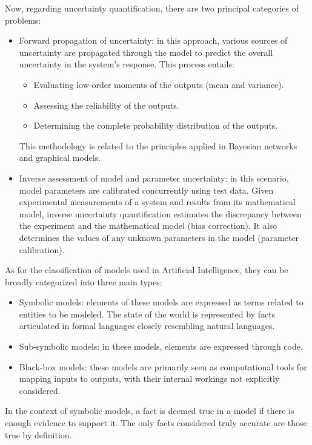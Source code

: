 Now, regarding uncertainty quantification, there are two principal categories of problems:
\begin{itemize}
    \item Forward propagation of uncertainty: in this approach, various sources of uncertainty are propagated through the model to predict the overall uncertainty in the system's response. 
        This process entails:
        \begin{itemize}
            \item Evaluating low-order moments of the outputs (mean and variance).
            \item Assessing the reliability of the outputs.
            \item Determining the complete probability distribution of the outputs. 
        \end{itemize}
        This methodology is related to the principles applied in Bayesian networks and graphical models.
    \item Inverse assessment of model and parameter uncertainty: in this scenario, model parameters are calibrated concurrently using test data. 
        Given experimental measurements of a system and results from its mathematical model, inverse uncertainty quantification estimates the discrepancy between the experiment and the mathematical model (bias correction). 
        It also determines the values of any unknown parameters in the model (parameter calibration).
\end{itemize}
As for the classification of models used in Artificial Intelligence, they can be broadly categorized into three main types:
\begin{itemize}
    \item Symbolic models: elements of these models are expressed as terms related to entities to be modeled. 
        The state of the world is represented by facts articulated in formal languages closely resembling natural languages.
    \item Sub-symbolic models: in these models, elements are expressed through code.
    \item Black-box models: these models are primarily seen as computational tools for mapping inputs to outputs, with their internal workings not explicitly considered.
\end{itemize}
In the context of symbolic models, a fact is deemed true in a model if there is enough evidence to support it. 
The only facts considered truly accurate are those true by definition. 